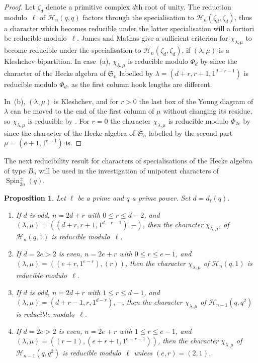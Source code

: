 \documentclass{ert-l}
\newcommand{\fS}{{\mathfrak{S}}}
\newcommand{\cH}{{\mathcal{H}}}
\newcommand{\Spin}{{\operatorname{Spin}}}
\let\la=\lambda
\newtheorem{prop}[thm]{Proposition}
\theoremstyle{definition}
\theoremstyle{remark}
\begin{document}
\begin{proof}
Let $\zeta_d$ denote a primitive complex $d$th root of unity. The reduction
modulo~$\ell$ of $\cH_n(q,q)$ factors through the specialisation to
$\cH_n(\zeta_d,\zeta_d)$, thus a character which becomes reducible under the
latter specialisation will a fortiori be reducible modulo~$\ell$.
James and Mathas \cite[Thms.~4.7(i) and~4.10]{JM00} give a sufficient
criterion for $\chi_{\la,\mu}$ to become reducible under the specialisation to
$\cH_n(\zeta_d,\zeta_d)$, if $(\la,\mu)$ is a Kleshchev bipartition.
In case~(a), $\chi_{\la,\mu}$ is reducible modulo $\Phi_d$ by
\cite[Thm.~4.10(i)]{JM00} since the character of the Hecke algebra of $\fS_n$
labelled by $\la=(d+r,r+1,1^{d-r-1})$ is reducible modulo $\Phi_d$, as the
first column hook lengths are different. \par
In~(b), $(\la,\mu)$ is Kleshchev, and for $r>0$ the last box of the Young
diagram of $\la$ can be moved to the end of the first column of $\mu$ without
changing its residue, so $\chi_{\la,\mu}$ is reducible by
\cite[Thm.~4.10(ii)]{JM00}. For $r=0$ the character $\chi_{\la,\mu}$ is
reducible modulo $\Phi_{2e}$ by \cite[Thm.~4.10(i)]{JM00} since the
character of the Hecke algebra of $\fS_n$ labelled by the second part
$\mu=(e+1,1^{e-1})$ is.
\end{proof}

The next reducibility result for characters of specialisations of the Hecke
algebra of type $B_n$ will be used in the investigation of
unipotent characters of $\Spin_{2n}^\pm(q)$.

\begin{prop}   \label{prop:HeckeD}
 Let $\ell$ be a prime and $q$ a prime power. Set $d=d_\ell(q)$.
 \begin{enumerate}
  \item[\rm(a)] If $d$ is odd, $n=2d+r$ with $0\le r\le d-2$, and
   $(\la,\mu)=((d+r,r+1,1^{d-r-1}),-)$, then the character $\chi_{\la,\mu}$,
   of $\cH_n(q,1)$ is reducible modulo~$\ell$.
  \item[\rm(b)] If $d=2e>2$ is even, $n=2e+r$ with $0\le r\le e-1$, and
   $(\la,\mu)=((e+r,1^{e-r}),(r))$, then the character $\chi_{\la,\mu}$ of
   $\cH_n(q,1)$ is reducible modulo~$\ell$.
  \item[\rm(c)] If $d$ is odd, $n=2d+r$ with $1\le r\le d-1$, and
   $(\la,\mu)=(d+r-1,r,1^{d-r}),-$, then the character $\chi_{\la,\mu}$ of
   $\cH_{n-1}(q,q^2)$ is reducible modulo~$\ell$.
  \item[\rm(d)] If $d=2e>2$ is even, $n=2e+r$ with $1\le r\le e-1$, and
   $(\la,\mu)=((r-1),(e+r+1,1^{e-r-1}))$, then the character $\chi_{\la,\mu}$
   of $\cH_{n-1}(q,q^2)$ is reducible modulo~$\ell$ unless $(e,r)=(2,1)$.
 \end{enumerate}
\end{prop}
\end{document}
